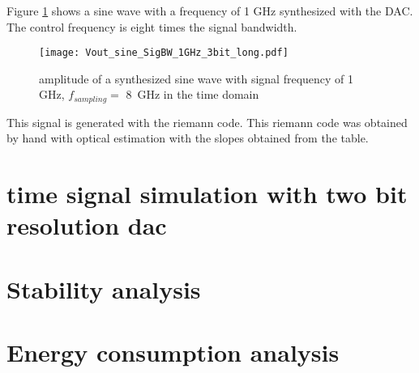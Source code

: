 Figure \ref{fig:1GHz sine} shows a sine wave with a frequency of 1 GHz synthesized with the DAC. The control frequency is eight times the signal bandwidth.
\begin{figure}[htb]
   \centering
   \texttt{[image: Vout\_sine\_SigBW\_1GHz\_3bit\_long.pdf]}
   \caption{amplitude of a synthesized sine wave with signal frequency of 1 GHz, $f_{sampling} =$ \SI{8}{\GHz} in the time domain}
   \label{fig:1GHz sine}
\end{figure}
This signal is generated with the riemann code. This riemann code was obtained by hand with optical estimation with the slopes obtained from the table.
%


\section{time signal simulation with two bit resolution dac}
\section{Stability analysis}
\section{Energy consumption analysis}
